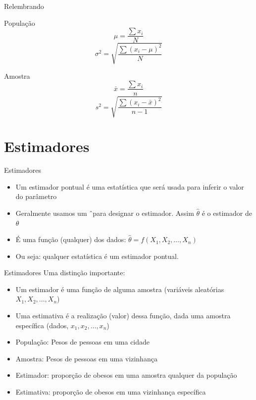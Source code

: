 \documentclass{beamer}
\begin{document}
\begin{frame}{Relembrando}
  \begin{block}{População}
    \begin{displaymath}
      \mu = \frac{\sum x_i}{N}
    \end{displaymath}
    \begin{displaymath}
      \sigma^2 = \sqrt{\frac{\sum (x_i - \mu)^2}{N} }
    \end{displaymath}
  \end{block}
  \begin{block}{Amostra}
    \begin{displaymath}
      \bar{x} = \frac{\sum x_i}{n}
    \end{displaymath}
    \begin{displaymath}
      s^2 = \sqrt{\frac{\sum (x_i - \bar{x})^2}{n-1} }
    \end{displaymath}
  \end{block}
\end{frame}

\section{Estimadores}

\begin{frame}{Estimadores}
  \begin{itemize}
  \item Um \alert{estimador pontual} é uma estatística que será usada
    para inferir o valor do parâmetro
  \item Geralmente usamos um \^\ para designar o estimador. Assim
    $\hat{\theta}$ é o estimador de $\theta$
  \item É uma função (qualquer) dos dados: $\hat{\theta} = f(X_1, X_2, \ldots, X_n)$
  \item Ou seja: qualquer estatística é um estimador pontual.
  \end{itemize}
\end{frame}

\begin{frame}{Estimadores}
Uma distinção importante:
  \begin{itemize}
  \item Um estimador é uma função de alguma amostra (variáveis
    aleatórias $X_1, X_2, \ldots, X_n$)
  \item Uma estimativa é a realização (valor) dessa função, dada uma
    amostra específica (dados, $x_1, x_2, \ldots, x_n$)
  \end{itemize}
  \begin{example}
    \begin{itemize}
    \item População: Pesos de pessoas em uma cidade
    \item Amostra: Pesos de pessoas em uma vizinhança
    \item Estimador: proporção de obesos em uma amostra qualquer da
      população
    \item Estimativa: proporção de obesos em uma vizinhança específica
    \end{itemize}
  \end{example}
\end{frame}
\end{document}
